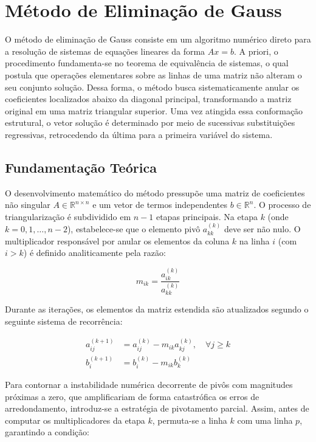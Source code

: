 \section{Método de Eliminação de Gauss}

O método de eliminação de Gauss consiste em um algoritmo numérico direto para a resolução de sistemas de equações lineares da forma $Ax = b$. A priori, o procedimento fundamenta-se no teorema de equivalência de sistemas, o qual postula que operações elementares sobre as linhas de uma matriz não alteram o seu conjunto solução. Dessa forma, o método busca sistematicamente anular os coeficientes localizados abaixo da diagonal principal, transformando a matriz original em uma matriz triangular superior. Uma vez atingida essa conformação estrutural, o vetor solução é determinado por meio de sucessivas substituições regressivas, retrocedendo da última para a primeira variável do sistema.

\subsection{Fundamentação Teórica}

O desenvolvimento matemático do método pressupõe uma matriz de coeficientes não singular $A \in \mathbb{R}^{n \times n}$ e um vetor de termos independentes $b \in \mathbb{R}^{n}$. O processo de triangularização é subdividido em $n-1$ etapas principais. Na etapa $k$ (onde $k = 0, 1, \dots, n-2$), estabelece-se que o elemento pivô $a_{kk}^{(k)}$ deve ser não nulo. O multiplicador responsável por anular os elementos da coluna $k$ na linha $i$ (com $i > k$) é definido analiticamente pela razão:

\begin{equation}
    m_{ik} = \frac{a_{ik}^{(k)}}{a_{kk}^{(k)}}
\end{equation}

Durante as iterações, os elementos da matriz estendida são atualizados segundo o seguinte sistema de recorrência:

\begin{align}
    a_{ij}^{(k+1)} &= a_{ij}^{(k)} - m_{ik} a_{kj}^{(k)}, \quad \forall j \geq k \\
    b_{i}^{(k+1)} &= b_{i}^{(k)} - m_{ik} b_{k}^{(k)}
\end{align}

Para contornar a instabilidade numérica decorrente de pivôs com magnitudes próximas a zero, que amplificariam de forma catastrófica os erros de arredondamento, introduz-se a estratégia de pivotamento parcial. Assim, antes de computar os multiplicadores da etapa $k$, permuta-se a linha $k$ com uma linha $p$, garantindo a condição:

